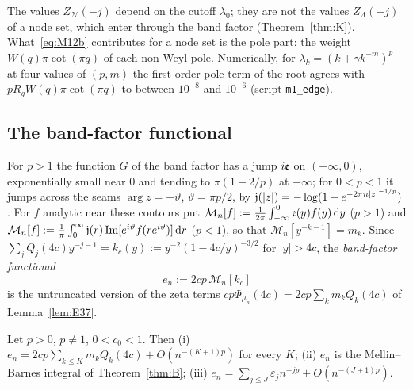 The values $Z_{\mathcal N}(-j)$ depend on the cutoff $\lambda_0$; they are not the values $Z_\Lambda(-j)$ of a node set, which enter through
the band factor (Theorem~\ref{thm:K}). What~\eqref{eq:M12b} contributes for a node set is the pole part: the weight $W(q)\pi\cot(\pi q)$ of
each non-Weyl pole. Numerically, for $\lambda_k=(k+\gamma k^{-m})^p$ at four values of $(p,m)$ the first-order pole term of the root agrees
with $pR_qW(q)\pi\cot(\pi q)$ to between $10^{-8}$ and $10^{-6}$ (script \texttt{m1\_edge}).

\subsection{The band-factor functional}\label{sec:en}
For $p>1$ the function $G$ of the band factor has a jump $i\mathfrak e$ on $(-\infty,0)$, exponentially small near $0$ and tending to
$\pi(1-2/p)$ at $-\infty$; for $0<p<1$ it jumps across the seams $\arg z=\pm\vartheta$, $\vartheta=\pi p/2$, by
$\mathfrak j(|z|)=-\log(1-e^{-2\pi n|z|^{-1/p}})$ \cite[Lemmas~8.1, 10.1]{PaperII}. For $f$ analytic near these contours put
$\mathcal M_n[f]:=\frac1{2\pi}\int_{-\infty}^0\mathfrak e(y)f(y)\,\mathrm{d} y$ ($p>1$) and
$\mathcal M_n[f]:=\frac1\pi\int_0^\infty\mathfrak j(r)\operatorname{Im}[e^{i\vartheta}f(re^{i\vartheta})]\,\mathrm{d} r$ ($p<1$), so that $\mathcal M_n[y^{-k-1}]=m_k$. Since
$\sum_jQ_j(4c)y^{-j-1}=k_c(y):=y^{-2}(1-4c/y)^{-3/2}$ for $|y|>4c$, the \emph{band-factor functional}
\begin{equation}\label{eq:en}
  e_n:=2cp\,\mathcal M_n[k_c]
\end{equation}
is the untruncated version of the zeta terms $cp\Phi_{\mu_n}(4c)=2cp\sum_km_kQ_k(4c)$ of Lemma~\ref{lem:E37}.

\begin{theorem}\label{thm:K}
Let $p>0$, $p\ne1$, $0<c_0<1$. Then \textup{(i)} $e_n=2cp\sum_{k\le K}m_kQ_k(4c)+O(n^{-(K+1)p})$ for every $K$;
\textup{(ii)} $e_n$ is the Mellin--Barnes integral of Theorem~\ref{thm:B}; \textup{(iii)} $e_n=\sum_{j\le J}\varepsilon_jn^{-jp}+O(n^{-(J+1)p})$.
\end{theorem}

